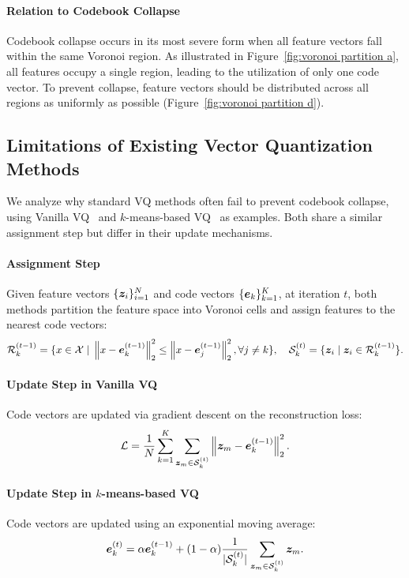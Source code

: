 \paragraph{Relation to Codebook Collapse} 
Codebook collapse occurs in its most severe form when all feature vectors fall within the same Voronoi region. As illustrated in Figure~\ref{fig:voronoi partition a}, all features occupy a single region, leading to the utilization of only one code vector. To prevent collapse, feature vectors should be distributed across all regions as uniformly as possible (Figure~\ref{fig:voronoi partition d}).

\subsection{Limitations of Existing Vector Quantization Methods}
\label{appendix:VQ codebook collapse}

We analyze why standard VQ methods often fail to prevent codebook collapse, using Vanilla VQ~\cite{Oord2017NeuralDR} and $k$-means-based VQ~\cite{Razavi2019GeneratingDH} as examples. Both share a similar assignment step but differ in their update mechanisms. 

\paragraph{Assignment Step} 
Given feature vectors $\{\bm{z}_i\}_{i=1}^N$ and code vectors $\{\bm{e}_k\}_{k=1}^K$, at iteration $t$, both methods partition the feature space into Voronoi cells and assign features to the nearest code vectors:
\begin{align}
\mathcal{R}_k^{(t-1)} = \{x \in \mathcal{X} \;|\; \left\Vert x- \bm{e}_k^{(t-1)} \right\Vert_2^{2} \le \left\Vert x- \bm{e}_j^{(t-1)} \right\Vert_2^{2}, \forall j \neq k\}, \quad \mathcal{S}_{k}^{(t)} = \{\bm{z}_i \;|\; \bm{z}_i \in \mathcal{R}_k^{(t-1)}\}. \nonumber
\end{align}

\paragraph{Update Step in Vanilla VQ} Code vectors are updated via gradient descent on the reconstruction loss:
\begin{align}
\mathcal{L} = \frac{1}{N}\sum_{k=1}^{K}\sum_{\bm{z}_m \in \mathcal{S}_{k}^{(t)}} \left\Vert \bm{z}_m - \bm{e}_k^{(t-1)} \right\Vert_2^{2}.
\end{align}

\paragraph{Update Step in $k$-means-based VQ} Code vectors are updated using an exponential moving average:
\begin{align}
\bm{e}_k^{(t)} = \alpha \bm{e}_k^{(t-1)} + (1-\alpha) \frac{1}{|\mathcal{S}_{k}^{(t)}|} \sum_{\bm{z}_m \in \mathcal{S}_{k}^{(t)}} \bm{z}_m.
\end{align}

